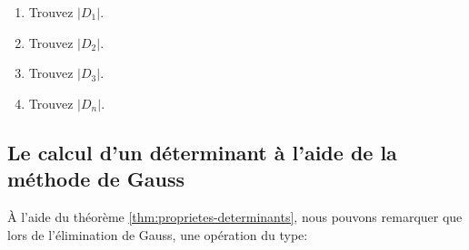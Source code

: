 \documentclass[]{book}
\providecommand{\tightlist}{%
  \setlength{\itemsep}{0pt}\setlength{\parskip}{0pt}}
\theoremstyle{definition}
\theoremstyle{definition}
\theoremstyle{definition}
\theoremstyle{remark}
\begin{document}
\begin{enumerate}
\def\labelenumi{\alph{enumi}.}
\tightlist
\item
  Trouvez \(\vert D_1\vert\).
\item
  Trouvez \(\vert D_2\vert\).
\item
  Trouvez \(\vert D_3\vert\).
\item
  Trouvez \(\vert D_n\vert\).
\end{enumerate}

\hypertarget{le-calcul-dun-determinant-a-laide-de-la-methode-de-gauss}{%
\subsection{Le calcul d'un déterminant à l'aide de la méthode de Gauss}\label{le-calcul-dun-determinant-a-laide-de-la-methode-de-gauss}}

À l'aide du théorème \ref{thm:proprietes-determinants}, nous pouvons remarquer que lors de l'élimination de Gauss, une opération du type:


\end{document}
